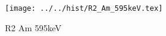 \begin{figure}[h] \centering\texttt{[image: ../../hist/R2\_Am\_595keV.tex]}\caption{R2 Am 595keV}\label{hist:R2_Am_595keV} \end{figure}
